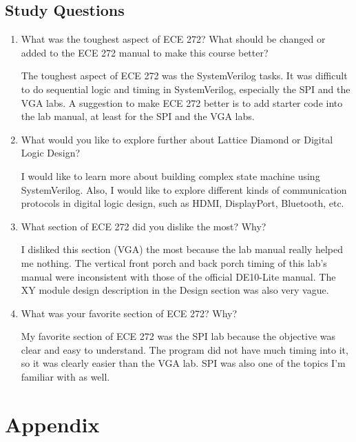 \documentclass[12pt]{article}
\numberwithin{figure}{section}
\begin{document}
\subsection*{Study Questions}

\begin{enumerate}
  \item What was the toughest aspect of ECE 272? What should be changed or added to the ECE 272 manual to make this course better?

  The toughest aspect of ECE 272 was the SystemVerilog tasks. It was difficult to do sequential logic and timing in SystemVerilog, especially the SPI and the VGA labs. A suggestion to make ECE 272 better is to add starter code into the lab manual, at least for the SPI and the VGA labs.

  \item What would you like to explore further about Lattice Diamond or Digital Logic Design?

  I would like to learn more about building complex state machine using SystemVerilog. Also, I would like to explore different kinds of communication protocols in digital logic design, such as HDMI, DisplayPort, Bluetooth, etc.

  \item What section of ECE 272 did you dislike the most? Why?

  I disliked this section (VGA) the most because the lab manual really helped me nothing. The vertical front porch and back porch timing of this lab's manual were inconsistent with those of the official DE10-Lite manual. The XY module design description in the Design section was also very vague.

  \item What was your favorite section of ECE 272? Why?

  My favorite section of ECE 272 was the SPI lab because the objective was clear and easy to understand. The program did not have much timing into it, so it was clearly easier than the VGA lab. SPI was also one of the topics I'm familiar with as well.
\end{enumerate}

\section*{Appendix} \label{sec:appendix}
\end{document}

